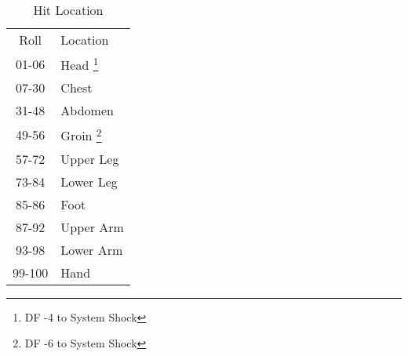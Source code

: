 
\begin{table}
	\begin{tabular}{cl}
	Roll			  &  Location \\
	01-06		   &  Head \footnote{DF -4 to System Shock}\\
	07-30		   &  Chest \\
	31-48		   &  Abdomen \\
	49-56		   &  Groin \footnote{DF -6 to System Shock}\\
	57-72		   &  Upper Leg \\
	73-84 			&  Lower Leg \\
	85-86		  		  &  Foot \\
	87-92		   &  Upper Arm \\
	93-98		   &  Lower Arm \\
	99-100			&  Hand \\	 
    \end{tabular}
    \caption{Hit Location}
\end{table}


